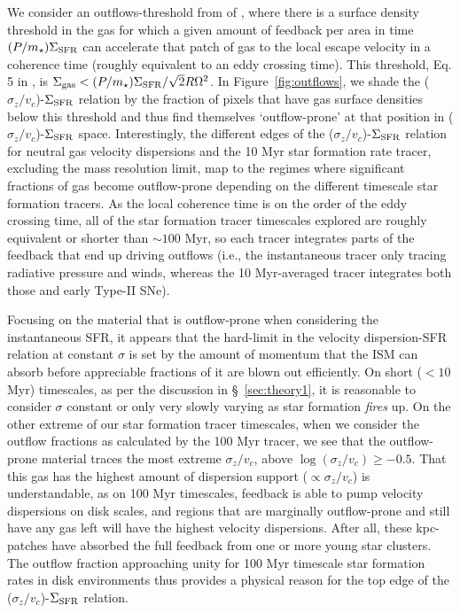 \documentclass[usletter,fleqn,usenatbib]{mnras}
\begin{document}
We consider an outflows-threshold from of \citet{Hayward2017}, where there is a surface density threshold in the gas for which a given amount of feedback per area in time $(P/m_\star)\Sigma_{\rm SFR}$ can accelerate that patch of gas to the local escape velocity in a coherence time (roughly equivalent to an eddy crossing time).  This threshold, Eq. 5 in \citet{Hayward2017}, is $\Sigma_{\rm gas} < (P/m_\star) \Sigma_{\rm SFR} / \sqrt{2}R\Omega^2$.  In Figure~\ref{fig:outflows}, we shade the ($\sigma_z/v_c$)-$\Sigma_{\rm SFR}$ relation by the fraction of pixels that have gas surface densities below this threshold and thus find themselves `outflow-prone' at that position in ($\sigma_z/v_c$)-$\Sigma_{\rm SFR}$ space.  Interestingly, the different edges of the ($\sigma_z/v_c$)-$\Sigma_{\rm SFR}$ relation for neutral gas velocity dispersions and the 10 Myr star formation rate tracer, excluding the mass resolution limit, map to the regimes where significant fractions of gas become outflow-prone depending on the different timescale star formation tracers.  As the local coherence time is on the order of the eddy crossing time, all of the star formation tracer timescales explored are roughly equivalent or shorter than $\sim 100$ Myr, so each tracer integrates parts of the feedback that end up driving outflows (i.e., the instantaneous tracer only tracing radiative pressure and winds, whereas the 10 Myr-averaged tracer integrates both those and early Type-II SNe).  

Focusing on the material that is outflow-prone when considering the instantaneous SFR, it appears that the hard-limit in the velocity dispersion-SFR relation at constant $\sigma$ is set by the amount of momentum that the ISM can absorb before appreciable fractions of it are blown out efficiently.  On short ($< 10$ Myr) timescales, as per the discussion in \S~\ref{sec:theory1}, it is reasonable to consider $\sigma$ constant or only very slowly varying as star formation \emph{fires} up.  On the other extreme of our star formation tracer timescales, when we consider the outflow fractions as calculated by the 100 Myr tracer, we see that the outflow-prone material traces the most extreme $\sigma_z/v_c$, above $\log(\sigma_z/v_c) \geq -0.5$.  That this gas has the highest amount of dispersion support ($\propto \sigma_z/v_c$) is understandable, as on 100 Myr timescales, feedback is able to pump velocity dispersions on disk scales, and regions that are marginally outflow-prone and still have any gas left will have the highest velocity dispersions.  After all, these kpc-patches have absorbed the full feedback from one or more young star clusters.  The outflow fraction approaching unity for 100 Myr timescale star formation rates in disk environments thus provides a physical reason for the top edge of the ($\sigma_z/v_c$)-$\Sigma_{\rm SFR}$ relation.  
\end{document}
